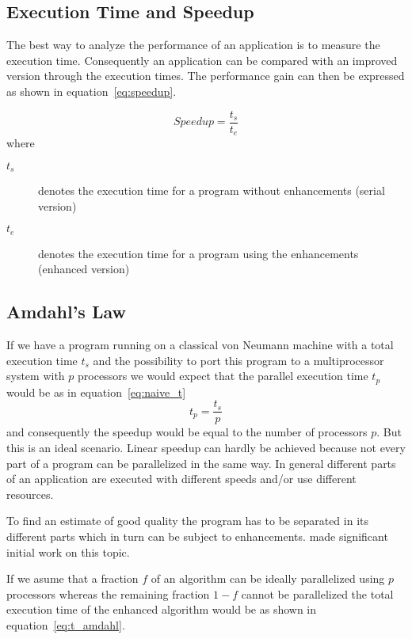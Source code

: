 \begin{description}
\begin{description}
\subsection{Execution Time and Speedup}

The best way to analyze the performance of an application is to
measure the execution time. Consequently an application can be compared
with an improved version through the execution times.
The performance gain can then be expressed as shown in
equation~\ref{eq:speedup}. 

\begin{equation}
\label{eq:speedup}
Speedup = \frac{t_s}{t_e}
\end{equation}
where
\begin{description}
\item[$t_s$] denotes the execution time for a program without
  enhancements (serial version)
\item[$t_e$] denotes the execution time for a program using the
  enhancements (enhanced version)
\end{description}

\subsection{Amdahl's Law}

If we have a program running on a classical von Neumann machine with a
total execution time $t_s$ and the possibility to port this program to
a multiprocessor system with $p$ processors we would expect that the
parallel execution time $t_p$ would be as in equation~\ref{eq:naive_t}
\begin{equation}
\label{eq:naive_t}
t_p = \frac{t_s}{p}
\end{equation}
and consequently the speedup would be equal to the number of
processors $p$.
But this is an ideal scenario. Linear speedup can hardly be achieved
because not every part of a program can be parallelized in the same
way. In general different parts of an application are executed with
different speeds and/or use different resources.

To find an estimate of good quality the program has to be separated in its
different parts which in turn can be subject to
enhancements. \cite{amdahl67vsp} made significant initial work on this
topic.

If we asume that a fraction $f$ of an algorithm can be ideally
parallelized using $p$ processors whereas the remaining fraction $1 -
f$ cannot be 
parallelized the total execution time of the enhanced algorithm would
be as shown in equation~\ref{eq:t_amdahl}.


\end{description}
\end{description}
